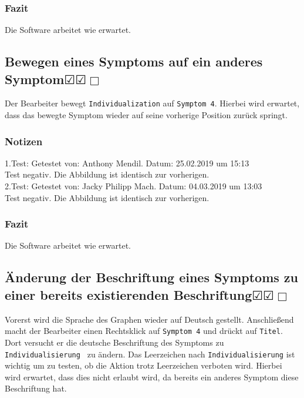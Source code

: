 \documentclass[enabledeprecatedfontcommands]{scrartcl}
\newcommand{\subsectiont}[2]{\subsection[#1]{#1{\normalsize\normalfont #2}}}
\newcommand{\leer}{$\Box$}
\newcommand{\ok}{$\CheckedBox$}
\begin{document}
\subsubsection{Fazit}
Die Software arbeitet wie erwartet.

\subsectiont{Bewegen eines Symptoms auf ein anderes Symptom}{\dotfill\ok\ok\leer} 
Der Bearbeiter bewegt \texttt{Individualization} auf \texttt{Symptom 4}. Hierbei wird erwartet, dass das bewegte Symptom wieder auf seine vorherige Position zurück springt. 
\subsubsection{Notizen}
1.Test: Getestet von: Anthony Mendil. Datum: 25.02.2019 um 15:13 \\
Test negativ. Die Abbildung ist identisch zur vorherigen. \\
2.Test: Getestet von: Jacky Philipp Mach. Datum: 04.03.2019 um 13:03 \\
Test negativ. Die Abbildung ist identisch zur vorherigen. 
\subsubsection{Fazit}
Die Software arbeitet wie erwartet.

\subsectiont{Änderung der Beschriftung eines Symptoms zu einer bereits existierenden Beschriftung}{\dotfill\ok\ok\leer}
Vorerst wird die Sprache des Graphen wieder auf Deutsch gestellt. Anschließend macht der Bearbeiter einen Rechtsklick auf \texttt{Symptom 4} und drückt auf \texttt{Titel}. Dort versucht er die deutsche Beschriftung des Symptoms zu \texttt{Individualisierung } zu ändern. Das Leerzeichen nach \texttt{Individualisierung} ist wichtig um zu testen, ob die Aktion trotz Leerzeichen verboten wird. Hierbei wird erwartet, dass dies nicht erlaubt wird, da bereits ein anderes Symptom diese Beschriftung hat. 
\end{document}
